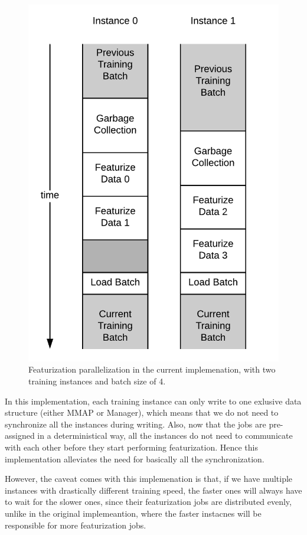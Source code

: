 \documentclass[conference]{IEEEtran}
\begin{document}
\begin{figure}[!htb]
	\includegraphics[width=\linewidth]{ci.png}
	\caption{\small 
		Featurization parallelization in the current implemenation, with two training instances and batch size of 4. }
	\label{fig:ci}
\end{figure}

In this implementation, each training instance can only write to one exlusive data structure (either MMAP or Manager), which means that we do not need to synchronize all the instances during writing. 
Also, now that the jobs are pre-assigned in a deterministical way, all the instances do not need to communicate with each other before they start performing featurization. 
Hence this implementation alleviates the need for basically all the synchronization. 

However, the caveat comes with this implemenation is that, if we have multiple instances with drastically different training speed, the faster ones will always have to wait for the slower ones, since their featurization jobs are distributed evenly, unlike in the original implemeantion, where the faster instacnes will be responsible for more featurization jobs. 
\end{document}

